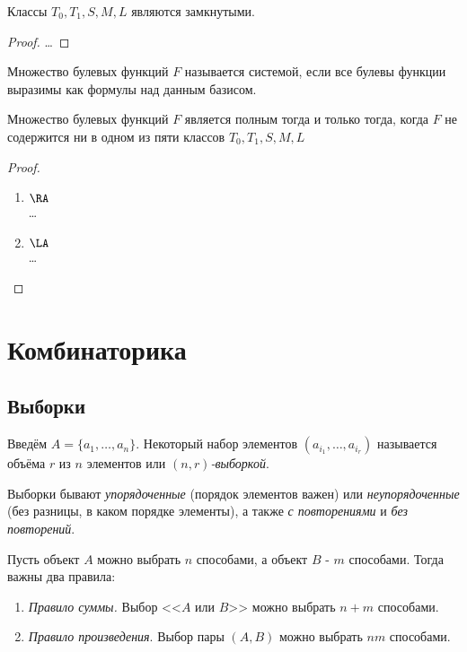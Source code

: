 \documentclass[a4paper, 14pt]{article}
\begin{document}
    \begin{theorem}
        Классы $T_0, T_1, S, M, L$ являются замкнутыми.
    \end{theorem}
    \begin{proof}
        \dots
    \end{proof}

    \begin{definition}
        Множество булевых функций $F$ называется { системой},
        если все булевы функции выразимы как формулы над данным базисом.
    \end{definition}

    \begin{theorem}
        Множество булевых функций $F$ является полным тогда и только
        тогда, когда $F$ не содержится ни в одном из пяти классов
        $T_0, T_1, S, M, L$
    \end{theorem}
    \begin{proof}
        \begin{enumerate}
            \item $\RA$ \\
            \dots
            \item $\LA$ \\
            \dots
        \end{enumerate}
    \end{proof}

    \section{Комбинаторика}
    \subsection*{Выборки}
    \begin{definition}
        Введём $A = \{a_1, \dots, a_n\}$. Некоторый набор элементов
        $(a_{i_1}, \dots, a_{i_r})$ называется { объёма $r$ из $n$ элементов} или {\it$(n,r)$-выборкой}.
    \end{definition}

    Выборки бывают {\it упорядоченные} (порядок элементов важен) или {\it неупорядоченные} (без разницы, в каком порядке элементы),
    а также {\it с повторениями} и {\it без повторений}.

    Пусть объект $A$ можно выбрать $n$ способами, а объект
    $B$ - $m$ способами. Тогда важны два правила:
    \begin{enumerate}
        \item {\it Правило суммы.} Выбор <<$A$ или $B$>> можно выбрать $n+m$ способами.
        \item {\it Правило произведения}. Выбор пары $(A, B)$ можно выбрать $nm$ способами.
    \end{enumerate}
\end{document}

